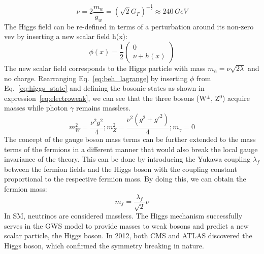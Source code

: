 \begin{itemize}
\begin{equation}
\nu = 2\frac{m_{w}}{g_{w}} = (\sqrt{2}G_{F})^{-\frac{1}{2}} \approx 240\,GeV 
\end{equation}
The Higgs field can be re-defined in terms of a perturbation around its non-zero vev by inserting a new scalar field h(x):
\begin{equation}\label{eq:higgs_state}
\phi(x) = \frac{1}{2}\left(\begin{array}{c}
0\\
\nu + h(x)
\end{array}\right)
\end{equation}
The new scalar field corresponds to the Higgs particle with mass $m_{h} = \nu\sqrt{2\lambda}$ and no charge. Rearranging Eq.~\ref{eq:beh_lagrange} by inserting $\phi$ from Eq.~\ref{eq:higgs_state} and defining the bosonic states as shown in expression~\ref{eq:electroweak}, we can see that the three bosons (W$^{\pm}$, Z$^{0}$) acquire masses while photon $\gamma$ remains massless.
\begin{equation}
m_{W}^{2} = \frac{\nu^{2}g^{2}}{4} ; m_{Z}^{2} = \frac{\nu^{2}(g^{2} + g'^{2})}{4}; m_{\gamma} = 0 
\end{equation}
The concept of the gauge boson mass terms can be further extended to the mass terms of the fermions in a different manner that would also break the local gauge invariance of the theory. This can be done by introducing the Yukawa coupling $\lambda_{f}$ between the fermion fields and the Higgs boson with the coupling constant proportional to the respective fermion mass. By doing this, we can obtain the fermion mass:
\begin{equation}
m_{f} = \frac{\lambda_{f}}{\sqrt{2}}\nu
\end{equation}
In SM, neutrinos are considered massless.
The Higgs mechanism successfully serves in the GWS model to provide masses to weak bosons and predict a new scalar particle, the Higgs boson. In 2012, both CMS and ATLAS discovered the Higgs boson, which confirmed the symmetry breaking in nature.
\end{itemize}

